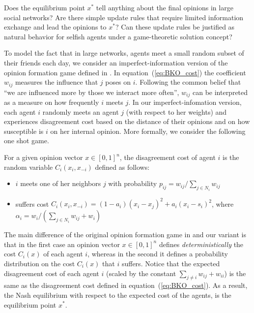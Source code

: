 \begin{question}
Does the equilibrium point $x^*$ tell anything about 
the final opinions in large social networks?
Are there simple update rules that require limited information
exchange and lead the opinions to $x^*$? Can these update rules be 
justified as natural behavior for selfish
agents under a game-theoretic solution concept?
\end{question}

To model the fact that in large networks, agents 
meet a small random subset of their friends each day, 
we consider an imperfect-information version of the 
opinion formation game defined in \cite{BKO11}. In equation~(\ref{eq:BKO_cost}) the 
coefficient $w_{ij}$ measures the influence that $j$ poses on $i$. 
Following the common belief that \enquote{we are influenced more by
those we interact more often}, $w_{ij}$ can be interpreted as 
a measure on how frequently $i$ meets $j$. In our  imperfect-infomation
version, each agent $i$ randomly meets an agent $j$ 
(with respect to her weights) and experiences disagreement cost
based on the distance of their opinions and on how susceptible is $i$
on her internal opinion. More formally, we consider the
following one shot game.
\begin{definition}\label{d:random_game}
  For a given opinion vector $x \in [0,1]^n$, the disagreement cost of agent $i$
  is the random variable $C_i(x_i,x_{-i})$ defined as follows:
  \begin{itemize}
    \item $i$ meets one of her neighbors $j$ with probability
      $p_{ij}= w_{ij}/\sum_{j\in N_i}w_{ij}$
    \item suffers cost $C_i(x_i , x_{-i}) = (1-a_i)(x_i-x_j)^2 + a_i(x_i-s_i)^2$,
      where $\alpha_i = w_i/(\sum_{j\in N_i}w_{ij}+w_i)$
  \end{itemize}
\end{definition}

\noindent The main difference of the original opinion formation game in \cite{BKO11} 
and our variant is that in the first case an opinion vector $x\in [0,1]^n$ defines
\emph{deterministically} the cost $C_i(x)$ of each agent $i$,
whereas in the second it defines a probability distribution on the cost
$C_i(x)$ that $i$ suffers. Notice that the expected 
disagreement cost of each agent $i$ (scaled by the constant $\sum_{j\neq i}w_{ij}+w_{ii}$)
is the same as the disagreement cost defined in equation~(\ref{eq:BKO_cost}).
As a result, the Nash equilibrium with respect to the expected cost of the agents,
is the equilibrium point $x^*$.

